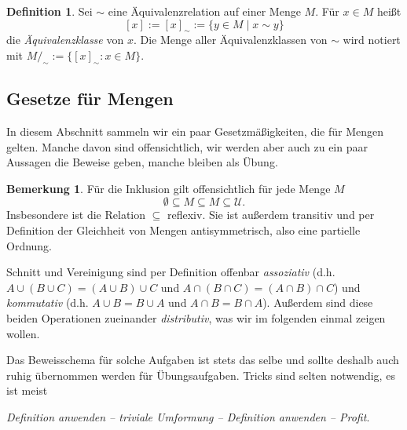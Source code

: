 \documentclass[11pt, a4paper]{article}
\theoremstyle{definition}
\newtheorem{definition}{Definition}[section]
\newtheorem*{remark*}{Bemerkung}
\theoremstyle{plain}
\numberwithin{equation}{section}
\begin{document}
\begin{definition}
	Sei \( \sim \) eine Äquivalenzrelation auf einer Menge \( M \). Für \( x \in M \) heißt
	\[
		[x] := [x]_\sim := \{ y \in M \mid x \sim y \}
	\]
	die \textit{Äquivalenzklasse} von \( x \). Die Menge aller Äquivalenzklassen von \( \sim \) wird notiert mit \( M /_\sim := \{ [x]_\sim : x \in M \} \).
\end{definition}



\subsection{Gesetze für Mengen}\label{sec:pre_setlaws}
In diesem Abschnitt sammeln wir ein paar Gesetzmäßigkeiten, die für Mengen gelten. Manche davon sind offensichtlich, wir werden aber auch zu ein paar Aussagen die Beweise geben, manche bleiben als Übung.
\begin{remark*}
	Für die Inklusion gilt offensichtlich für jede Menge \( M \)
	\[
		\emptyset \subseteq M \subseteq M \subseteq \mathcal{U}.
	\]
	Insbesondere ist die Relation \( \subseteq \) reflexiv. Sie ist außerdem transitiv und per Definition der Gleichheit von Mengen antisymmetrisch, also eine partielle Ordnung.\par
	Schnitt und Vereinigung sind per Definition offenbar \textit{assoziativ} (d.h. \( A \cup (B \cup C) = (A \cup B) \cup C \) und \( A \cap (B \cap C) = (A \cap B) \cap C \)) und \textit{kommutativ} (d.h. \( A \cup B = B \cup A \) und \( A \cap B = B \cap A \)). Außerdem sind diese beiden Operationen zueinander \textit{distributiv}, was wir im folgenden einmal zeigen wollen. 
\end{remark*}
Das Beweisschema für solche Aufgaben ist stets das selbe und sollte deshalb auch ruhig übernommen werden für Übungsaufgaben. Tricks sind selten notwendig, es ist meist
\begin{center}
	\textit{Definition anwenden -- triviale Umformung -- Definition anwenden -- Profit}.
\end{center}
\end{document}
